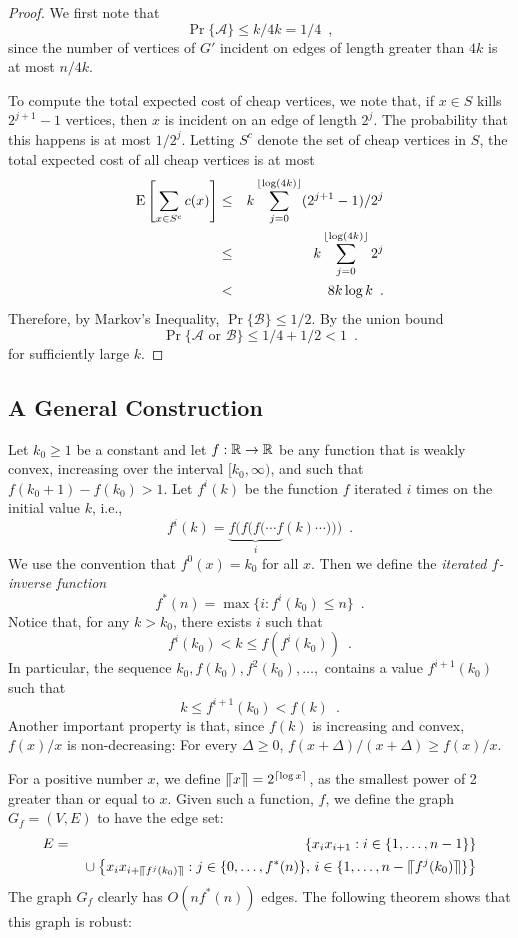\documentclass{patmorin}
\begin{document}
\begin{proof}
We first note that 
\[
   \Pr\{\mathcal{A}\} \le k/4k = 1/4 \enspace ,
\]
since the number of vertices of $G'$ incident on edges of length greater
than $4k$ is at most $n/4k$.

To compute the total expected cost of cheap vertices, we note that, if
$x\in S$ kills $2^{j+1}-1$ vertices, then $x$ is incident on an edge of
length $2^{j}$.  The probability that this happens is at most $1/2^{j}$.
Letting $S^{c}$ denote the set of cheap vertices in $S$,
the total expected cost of all cheap vertices is at most
\begin{eqnarray*}
   \mathrm{E}\left[\sum_{x\in S^{c}}c(x) \right] 
  &\le&  k\sum_{j=0}^{{\lfloor \log (4k) \rfloor}} (2^{j+1}-1)/2^j \\
   &\le& k\sum_{j=0}^{{\lfloor \log (4k) \rfloor}} 2^j \\
   &<& 8k\log k \enspace .
\end{eqnarray*}
Therefore, by Markov's Inequality, $\Pr\{\mathcal{B}\}\le 1/2$.
By the union bound
\[
   \Pr\{\mbox{$\mathcal{A}$ or $\mathcal{B}$}\} \le 1/4+ 1/2 < 1
\enspace .
\]
for sufficiently large $k$.
\end{proof}

\subsection{A General Construction}

Let $k_0\ge 1$ be a constant and let $f:\mathbb{R}\rightarrow\mathbb{R}$ be any function
that is weakly convex, increasing over the interval $[k_0,\infty)$,
and such that $f(k_0+1)-f(k_0) > 1$.  Let $f^{i}(k)$ be the function $f$
iterated $i$ times on the initial value $k$, i.e.,
\[
   f^{i}(k) = \underbrace{f(f(f(\cdots f}_{i}(k)\cdots))) \enspace .
\]
We use the convention that $f^0(x) = k_0$ for all $x$.
Then we define the \emph{iterated
$f$-inverse function}
\[
   f^*(n) = \max\{i : f^{i}(k_0) \le n\} \enspace .
\] 
Notice that, for any $k> k_0$, there exists $i$ such that
\[
   f^i(k_0) < k \le f(f^i(k_0)) \enspace .
\]
In particular, the sequence $k_0,f(k_0),f^2(k_0),\ldots,$ contains
a value $f^{i+1}(k_0)$ such that
\[
      k  \le  f^{i+1}(k_0) < f(k) \enspace .
\]
Another important property is that, since $f(k)$ is increasing
and convex, $f(x)/x$ is non-decreasing: For every $\Delta\ge 0$,
$f(x+\Delta)/(x+\Delta) \ge f(x)/x$.

\newcommand{\upen}[1]{\llceil#1\rrceil}

For a positive number $x$, we define $\upen{x}=2^{\ceil{\log x}}$, as the
smallest power of 2 greater than or equal to $x$.  Given such a function,
$f$, we define the graph $G_f=(V,E)$ to have the edge set:
\begin{eqnarray*}
    E &=& \quad\left\{ x_ix_{i+1} : i\in\{1,\ldots,n-1\} \right\} \\
     && {} \cup \left\{ x_{i}x_{i+\upen{f^j(k_0)}} : j\in\{0,\ldots,f^*(n)\},\,
        i\in\{1,\ldots,n-\upen{f^j(k_0)}\} \right\}
\end{eqnarray*}
The graph $G_f$ clearly has $O(nf^*(n))$ edges.  The following theorem shows that this graph is robust:
\end{document}
